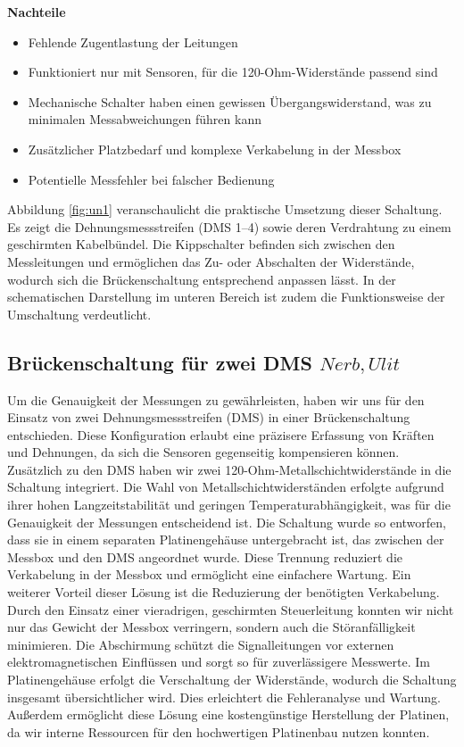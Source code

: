\textbf{Nachteile}
\begin{itemize}
    \item Fehlende Zugentlastung der Leitungen
    \item Funktioniert nur mit Sensoren, für die 120-Ohm-Widerstände passend sind
    \item Mechanische Schalter haben einen gewissen Übergangswiderstand, was zu minimalen Messabweichungen führen kann
    \item Zusätzlicher Platzbedarf und komplexe Verkabelung in der Messbox
    \item Potentielle Messfehler bei falscher Bedienung
\end{itemize}


Abbildung \ref{fig:un1} veranschaulicht die praktische Umsetzung dieser Schaltung.
Es zeigt die Dehnungsmessstreifen (DMS 1–4) sowie deren Verdrahtung zu einem geschirmten Kabelbündel.
Die Kippschalter befinden sich zwischen den Messleitungen und ermöglichen das Zu- oder Abschalten der Widerstände, wodurch sich die Brückenschaltung entsprechend anpassen lässt.
In der schematischen Darstellung im unteren Bereich ist zudem die Funktionsweise der Umschaltung verdeutlicht.




\subsection{Br\"uckenschaltung f\"ur zwei DMS \(Nerb, Ulit\)}
Um die Genauigkeit der Messungen zu gewährleisten, haben wir uns für den Einsatz von zwei Dehnungsmessstreifen (DMS) in einer Brückenschaltung entschieden.
Diese Konfiguration erlaubt eine präzisere Erfassung von Kräften und Dehnungen, da sich die Sensoren gegenseitig kompensieren können.
Zusätzlich zu den DMS haben wir zwei 120-Ohm-Metallschichtwiderstände in die Schaltung integriert.
Die Wahl von Metallschichtwiderständen erfolgte aufgrund ihrer hohen Langzeitstabilität und geringen Temperaturabhängigkeit, was für die Genauigkeit der Messungen entscheidend ist.
Die Schaltung wurde so entworfen, dass sie in einem separaten Platinengehäuse untergebracht ist, das zwischen der Messbox und den DMS angeordnet wurde.
Diese Trennung reduziert die Verkabelung in der Messbox und ermöglicht eine einfachere Wartung.
Ein weiterer Vorteil dieser Lösung ist die Reduzierung der benötigten Verkabelung.
Durch den Einsatz einer vieradrigen, geschirmten Steuerleitung konnten wir nicht nur das Gewicht der Messbox verringern, sondern auch die Störanfälligkeit minimieren.
Die Abschirmung schützt die Signalleitungen vor externen elektromagnetischen Einflüssen und sorgt so für zuverlässigere Messwerte.
Im Platinengehäuse erfolgt die Verschaltung der Widerstände, wodurch die Schaltung insgesamt übersichtlicher wird. Dies erleichtert die Fehleranalyse und Wartung.
Außerdem ermöglicht diese Lösung eine kostengünstige Herstellung der Platinen, da wir interne Ressourcen für den hochwertigen Platinenbau nutzen konnten. 

